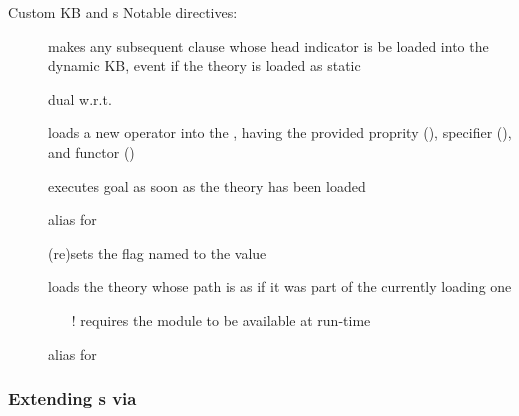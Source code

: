 \documentclass[handout]{beamer}
\begin{document}
\begin{frame}[allowframebreaks]{Custom KB and s}
    Notable directives:
    \begin{description}
        \item[] makes any subsequent clause whose head indicator is  be loaded into the \alert{dynamic} KB, event if the theory is loaded as static
        \item[] dual w.r.t. 
        \item[] loads a new operator into the , having the provided proprity (), specifier (), and functor ()
        \item[] executes goal  as soon as the theory has been loaded
        \item[] alias for 
        \item[] (re)sets the flag named  to the value 
        \item[] loads the theory whose path is  as if it was part of the currently loading one
        \begin{itemize}\small
            \item[!] requires the  module to be available at run-time
        \end{itemize}
        \item[] alias for 
    \end{description}

    \framebreak

\end{frame}

\subsubsection{Extending s via }
\end{document}
